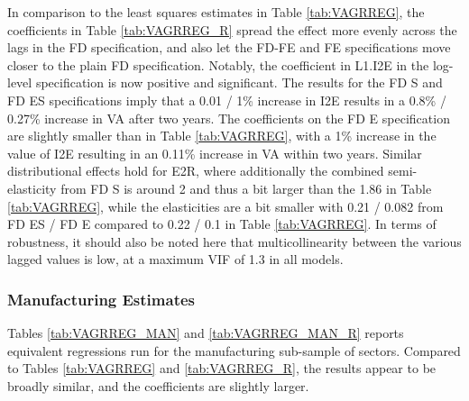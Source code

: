 \documentclass[a4paper]{article}
\begin{document}
In comparison to the least squares estimates in Table \ref{tab:VAGRREG}, the coefficients in Table \ref{tab:VAGRREG_R} spread the effect more evenly across the lags in the FD specification, and also let the FD-FE and FE specifications move closer to the plain FD specification. Notably, the coefficient in L1.I2E in the log-level specification is now positive and significant. The results for the FD S and FD ES specifications imply that a 0.01 / 1\% increase in I2E results in a 0.8\% / 0.27\% increase in VA after two years. The coefficients on the FD E specification are slightly smaller than in Table  \ref{tab:VAGRREG}, with a 1\% increase in the value of I2E resulting in an 0.11\% increase in VA within two years. Similar distributional effects hold for E2R, where additionally the combined semi-elasticity from FD S is around 2 and thus a bit larger than the 1.86 in Table \ref{tab:VAGRREG}, while the elasticities are a bit smaller with 0.21 / 0.082 from FD ES / FD E compared to 0.22 / 0.1 in Table \ref{tab:VAGRREG}. In terms of robustness, it should also be noted here that multicollinearity between the various lagged values is low, at a maximum VIF of 1.3 in all models. 

\subsubsection{Manufacturing Estimates}

Tables \ref{tab:VAGRREG_MAN} and \ref{tab:VAGRREG_MAN_R} reports equivalent regressions run for the manufacturing sub-sample of sectors. Compared to Tables \ref{tab:VAGRREG} and \ref{tab:VAGRREG_R}, the results appear to be broadly similar, and the coefficients are slightly larger. 
\end{document}
